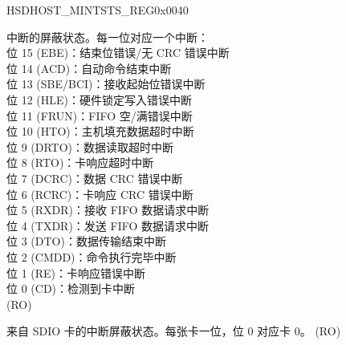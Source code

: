 \begin{register}{H}{SDHOST\_MINTSTS\_REG}{0x0040}\label{regdesc:SDHOSTMINTSTSREG}
%
%
%
\regnewline%
\begin{regdesc}\begin{reglist}
\label{fielddesc:SDHOSTINTSTATUSMSK}\item [SDHOST\_INT\_STATUS\_MSK] 中断的屏蔽状态。每一位对应一个中断：\\
位 15 (EBE)：结束位错误/无 CRC 错误中断\\
位 14 (ACD)：自动命令结束中断\\
位 13 (SBE/BCI)：接收起始位错误中断\\
位 12 (HLE)：硬件锁定写入错误中断\\
位 11 (FRUN)：FIFO 空/满错误中断\\
位 10 (HTO)：主机填充数据超时中断\\
位 9 (DRTO)：数据读取超时中断\\
位 8 (RTO)：卡响应超时中断\\
位 7 (DCRC)：数据 CRC 错误中断\\
位 6 (RCRC)：卡响应 CRC 错误中断\\
位 5 (RXDR)：接收 FIFO 数据请求中断\\
位 4 (TXDR)：发送 FIFO 数据请求中断\\
位 3 (DTO)：数据传输结束中断\\
位 2 (CMDD)：命令执行完毕中断\\
位 1 (RE)：卡响应错误中断\\
位 0 (CD)：检测到卡中断\\ (RO)
\label{fielddesc:SDHOSTSDIOINTERRUPTMSK}\item [SDHOST\_SDIO\_INTERRUPT\_MSK] 来自 SDIO 卡的中断屏蔽状态。每张卡一位，位 0 对应卡 0。 (RO)
\end{reglist}\end{regdesc}
\end{register}


